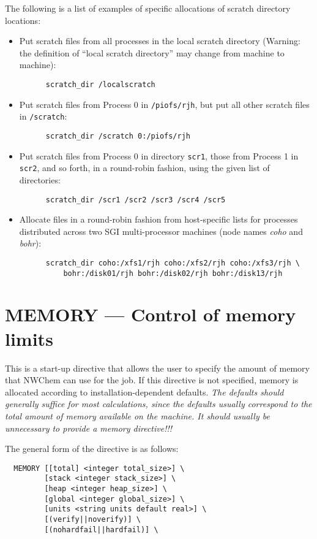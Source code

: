 The following is a list of examples of specific allocations of scratch
directory locations:
\begin{itemize}
\item Put scratch files from all processes in the local scratch directory 
(Warning: the definition of ``local scratch directory'' may change from 
machine to machine):
\begin{verbatim}
      scratch_dir /localscratch
\end{verbatim}
\item Put scratch files from Process 0 in \verb+/piofs/rjh+, but put all 
other scratch files in \verb+/scratch+:
\begin{verbatim}
      scratch_dir /scratch 0:/piofs/rjh
\end{verbatim}
\item Put scratch files from Process 0 in directory \verb+scr1+, those from
Process 1 in \verb+scr2+, and so forth, in a round-robin fashion, using the
given list of directories:
\begin{verbatim}
      scratch_dir /scr1 /scr2 /scr3 /scr4 /scr5
\end{verbatim}
\item Allocate files in a round-robin fashion from
  host-specific lists for processes distributed across two
 SGI multi-processor machines (node names {\em coho} and {\em bohr}):
\begin{verbatim}
      scratch_dir coho:/xfs1/rjh coho:/xfs2/rjh coho:/xfs3/rjh \
          bohr:/disk01/rjh bohr:/disk02/rjh bohr:/disk13/rjh
\end{verbatim}
\end{itemize}

\section{MEMORY --- Control of memory limits}

This is a start-up directive that allows the user to specify the
amount of memory that NWChem can use for the job.  If this directive
is not specified, memory is allocated according to
installation-dependent defaults.  {\em The defaults should generally
  suffice for most calculations, since the defaults usually correspond
  to the total amount of memory available on the machine.  It should
usually be unnecessary to provide a memory directive!!!} 

The general form of the directive is as follows:

\begin{verbatim}
  MEMORY [[total] <integer total_size>] \
         [stack <integer stack_size>] \
         [heap <integer heap_size>] \
         [global <integer global_size>] \
         [units <string units default real>] \
         [(verify||noverify)] \
         [(nohardfail||hardfail)] \
\end{verbatim}

